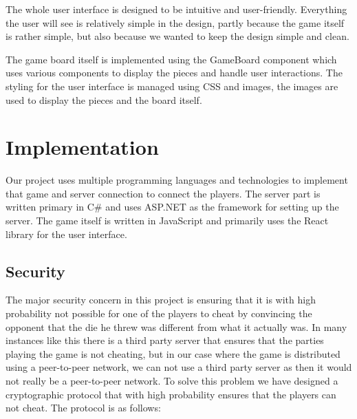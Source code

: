 \documentclass[ twoside,openright,titlepage,numbers=noenddot,headinclude,%
                footinclude=true,cleardoublepage=empty,abstractoff, %
                BCOR=5mm,paper=a4,fontsize=11pt,%
                ngerman,american,%
                ]{scrreprt}
\begin{document}
The whole user interface is designed to be intuitive and user-friendly. Everything the user will see is relatively simple in the design, partly because the game itself is rather simple, but also because we wanted to keep the design simple and clean. 

The game board itself is implemented using the GameBoard component which uses various components to display the pieces and handle user interactions. The styling for the user interface is managed using CSS and images, the images are used to display the pieces and the board itself. 

\section{Implementation}
Our project uses multiple programming languages and technologies to implement that game and server connection to connect the players. The server part is written primary in C\# and uses ASP.NET as the framework for setting up the server. The game itself is written in JavaScript and primarily uses the React library for the user interface.

\subsection{Security}
\label{sec:security}
The major security concern in this project is ensuring that it is with high probability not possible for one of the players to cheat by convincing the opponent that the die he threw was different from what it actually was. In many instances like this there is a third party server that ensures that the parties playing the game is not cheating, but in our case where the game is distributed using a peer-to-peer network, we can not use a third party server as then it would not really be a peer-to-peer network. To solve this problem we have designed a cryptographic protocol that with high probability ensures that the players can not cheat. The protocol is as follows: 
\end{document}
